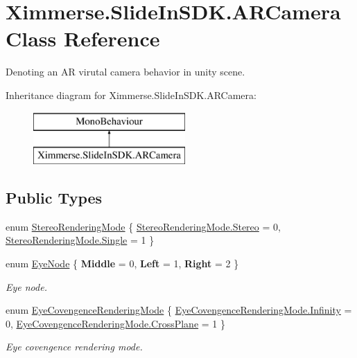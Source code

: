 \hypertarget{class_ximmerse_1_1_slide_in_s_d_k_1_1_a_r_camera}{}\section{Ximmerse.\+Slide\+In\+S\+D\+K.\+A\+R\+Camera Class Reference}
\label{class_ximmerse_1_1_slide_in_s_d_k_1_1_a_r_camera}


Denoting an AR virutal camera behavior in unity scene.  


Inheritance diagram for Ximmerse.\+Slide\+In\+S\+D\+K.\+A\+R\+Camera\+:\begin{figure}[H]
\begin{center}
\leavevmode
\includegraphics[height=2.000000cm]{class_ximmerse_1_1_slide_in_s_d_k_1_1_a_r_camera}
\end{center}
\end{figure}
\subsection*{Public Types}
\begin{DoxyCompactItemize}
\item 
enum \mbox{\hyperlink{class_ximmerse_1_1_slide_in_s_d_k_1_1_a_r_camera_af5ab911106768696ff764dd86e435d58}{Stereo\+Rendering\+Mode}} \{ \mbox{\hyperlink{class_ximmerse_1_1_slide_in_s_d_k_1_1_a_r_camera_af5ab911106768696ff764dd86e435d58abbc45d9b35436f5f0ed9e33499efcea9}{Stereo\+Rendering\+Mode.\+Stereo}} = 0, 
\mbox{\hyperlink{class_ximmerse_1_1_slide_in_s_d_k_1_1_a_r_camera_af5ab911106768696ff764dd86e435d58a66ba162102bbf6ae31b522aec561735e}{Stereo\+Rendering\+Mode.\+Single}} = 1
 \}
\item 
enum \mbox{\hyperlink{class_ximmerse_1_1_slide_in_s_d_k_1_1_a_r_camera_a7f787b2284b4693f532a82bb7c4fb694}{Eye\+Node}} \{ {\bfseries Middle} = 0, 
{\bfseries Left} = 1, 
{\bfseries Right} = 2
 \}
\begin{DoxyCompactList}\small\item\em Eye node. \end{DoxyCompactList}\item 
enum \mbox{\hyperlink{class_ximmerse_1_1_slide_in_s_d_k_1_1_a_r_camera_a52b8f8314b24b886c20c6a8f4f7447bf}{Eye\+Covengence\+Rendering\+Mode}} \{ \mbox{\hyperlink{class_ximmerse_1_1_slide_in_s_d_k_1_1_a_r_camera_a52b8f8314b24b886c20c6a8f4f7447bfaeb2ac5b04180d8d6011a016aeb8f75b3}{Eye\+Covengence\+Rendering\+Mode.\+Infinity}} = 0, 
\mbox{\hyperlink{class_ximmerse_1_1_slide_in_s_d_k_1_1_a_r_camera_a52b8f8314b24b886c20c6a8f4f7447bfab1484fe676467e6493bab0bf759eab26}{Eye\+Covengence\+Rendering\+Mode.\+Cross\+Plane}} = 1
 \}
\begin{DoxyCompactList}\small\item\em Eye covengence rendering mode. \end{DoxyCompactList}\end{DoxyCompactItemize}
